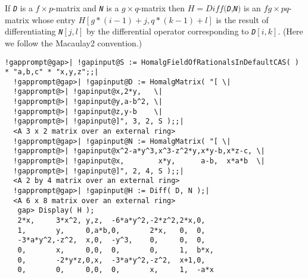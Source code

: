 \documentclass[a4paper,11pt]{report}
\begin{document}
{{{ If \mbox{\texttt{\mdseries\slshape D}} is a $f \times p$-matrix and \mbox{\texttt{\mdseries\slshape N}} is a $g \times q$-matrix then $H=Diff($\mbox{\texttt{\mdseries\slshape D}},\mbox{\texttt{\mdseries\slshape N}}$)$ is an $fg \times pq$-matrix whose entry $H[g*(i-1)+j,q*(k-1)+l]$ is the result of differentiating \mbox{\texttt{\mdseries\slshape N}}$[j,l]$ by the differential operator corresponding to \mbox{\texttt{\mdseries\slshape D}}$[i,k]$. (Here we follow the Macaulay2 convention.) 
\begin{Verbatim}[commandchars=!@|,fontsize=\small,frame=single,label=Example]
  !gapprompt@gap>| !gapinput@S := HomalgFieldOfRationalsInDefaultCAS( ) * "a,b,c" * "x,y,z";;|
  !gapprompt@gap>| !gapinput@D := HomalgMatrix( "[ \|
  !gapprompt@>| !gapinput@x,2*y,   \|
  !gapprompt@>| !gapinput@y,a-b^2, \|
  !gapprompt@>| !gapinput@z,y-b    \|
  !gapprompt@>| !gapinput@]", 3, 2, S );;|
  <A 3 x 2 matrix over an external ring>
  !gapprompt@gap>| !gapinput@N := HomalgMatrix( "[ \|
  !gapprompt@>| !gapinput@x^2-a*y^3,x^3-z^2*y,x*y-b,x*z-c, \|
  !gapprompt@>| !gapinput@x,        x*y,      a-b,  x*a*b  \|
  !gapprompt@>| !gapinput@]", 2, 4, S );;|
  <A 2 by 4 matrix over an external ring>
  !gapprompt@gap>| !gapinput@H := Diff( D, N );|
  <A 6 x 8 matrix over an external ring>
   gap> Display( H );
   2*x,     3*x^2, y,z,  -6*a*y^2,-2*z^2,2*x,0,  
   1,       y,     0,a*b,0,       2*x,   0,  0,  
   -3*a*y^2,-z^2,  x,0,  -y^3,    0,     0,  0,  
   0,       x,     0,0,  0,       0,     1,  b*x,
   0,       -2*y*z,0,x,  -3*a*y^2,-z^2,  x+1,0,  
   0,       0,     0,0,  0,       x,     1,  -a*x
\end{Verbatim}
 }

 }

  }
\end{document}
